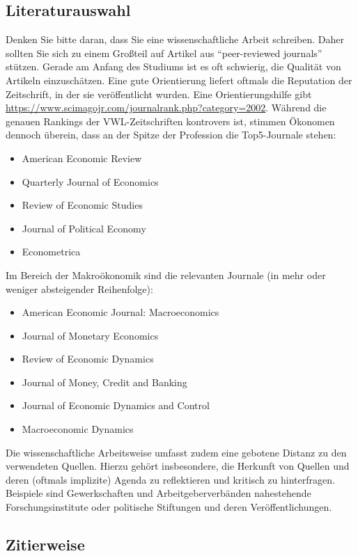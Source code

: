 \documentclass[a4paper,12pt]{scrartcl} %
\begin{document}
\subsection{Literaturauswahl}

Denken Sie bitte daran, dass Sie eine wissenschaftliche Arbeit schreiben. Daher sollten Sie sich zu einem Großteil auf Artikel aus ``peer-reviewed journals'' stützen. Gerade am Anfang des Studiums ist es oft schwierig, die Qualität von Artikeln einzuschätzen. Eine gute Orientierung liefert oftmals die Reputation der Zeitschrift, in der sie veröffentlicht wurden. Eine Orientierungshilfe gibt \url{https://www.scimagojr.com/journalrank.php?category=2002}. Während die genauen Rankings der VWL-Zeitschriften kontrovers ist, stimmen Ökonomen dennoch überein, dass an der Spitze der Profession die Top5-Journale stehen:
\begin{itemize}
  \item American Economic Review
  \item Quarterly Journal of Economics
  \item Review of Economic Studies
  \item Journal of Political Economy
  \item Econometrica
\end{itemize}

Im Bereich der Makroökonomik sind die relevanten Journale (in mehr oder weniger absteigender Reihenfolge):
\begin{itemize}
  \item American Economic Journal: Macroeconomics
  \item Journal of Monetary Economics
  \item Review of Economic Dynamics
  \item Journal of Money, Credit and Banking
  \item Journal of Economic Dynamics and Control
  \item Macroeconomic Dynamics
\end{itemize}

Die wissenschaftliche Arbeitsweise umfasst zudem eine gebotene Distanz zu den verwendeten Quellen. Hierzu gehört insbesondere, die Herkunft von Quellen und deren (oftmals implizite) Agenda zu reflektieren und kritisch zu hinterfragen. Beispiele sind Gewerkschaften und Arbeitgeberverbänden nahestehende Forschungsinstitute oder politische Stiftungen und deren Veröffentlichungen.

\subsection{Zitierweise}
\end{document}
